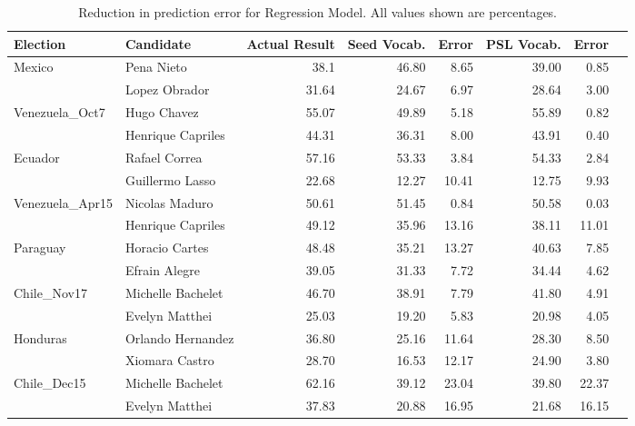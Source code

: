 \begin{table}
		\centering
		\begin{tabular}{| l | l | r | r | r | r | r | r |}
		\hline
		Election & Candidate & Actual Result & Seed Vocab. & Error & PSL Vocab. & Error \\
		\hline
		\multirow{2}{*}{Mexico} & Pena Nieto & 38.1 & 46.80 & 8.65 & 39.00 & 0.85 \\\cline{2-7}
											   & Lopez Obrador & 31.64 & 24.67 & 6.97 & 28.64 & 3.00 \\
		\hline
		\multirow{2}{*}{Venezuela\_Oct7} & Hugo Chavez & 55.07 & 49.89 & 5.18 & 55.89 & 0.82\\\cline{2-7}
																& Henrique Capriles & 44.31 & 36.31 & 8.00 & 43.91 & 0.40 \\
		\hline
		\multirow{2}{*}{Ecuador} & Rafael Correa & 57.16 & 53.33 & 3.84 & 54.33 & 2.84 \\\cline{2-7}
												 & Guillermo Lasso & 22.68 & 12.27 & 10.41 & 12.75 & 9.93 \\
		\hline
		 \multirow{2}{*}{Venezuela\_Apr15} & Nicolas Maduro & 50.61 & 51.45 & 0.84 & 50.58 & 0.03 \\\cline{2-7}
																	& Henrique Capriles & 49.12 & 35.96 & 13.16 & 38.11 & 11.01 \\
		\hline
		\multirow{2}{*}{Paraguay} & Horacio Cartes & 48.48 & 35.21 & 13.27 & 40.63 & 7.85 \\\cline{2-7}
												   & Efrain Alegre & 39.05 & 31.33	 & 7.72 & 34.44 & 4.62 \\
		\hline
		\multirow{2}{*}{Chile\_Nov17} & Michelle Bachelet & 46.70 & 38.91 & 7.79 & 41.80 & 4.91\\\cline{2-7}
														  & Evelyn Matthei & 25.03 & 19.20 & 5.83 & 20.98 & 4.05 \\
		\hline 
		\multirow{2}{*}{Honduras} & Orlando Hernandez & 36.80 & 25.16 & 11.64 & 28.30 & 8.50 \\\cline{2-7}
												   & Xiomara Castro & 28.70 & 16.53 & 12.17 & 24.90 & 3.80 \\
		\hline
		\multirow{2}{*}{Chile\_Dec15} & Michelle Bachelet & 62.16 & 39.12 & 23.04 & 39.80 & 22.37\\\cline{2-7}
															& Evelyn Matthei & 37.83 & 20.88 & 16.95 & 21.68 & 16.15 \\
		\hline 											 
		\end{tabular}
		\caption{Reduction in prediction error for Regression Model. All values shown are percentages.}
		\label{table:RegModel}
	\end{table}
	
